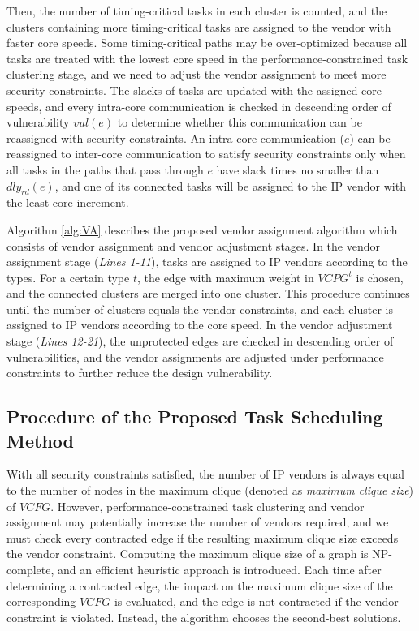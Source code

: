 \documentclass[10pt,journal, compsoc]{IEEEtran}
\begin{document}
Then, the number of timing-critical tasks in each cluster is counted, and the clusters containing more timing-critical tasks are assigned to the vendor with faster core speeds. Some timing-critical paths may be over-optimized because all tasks are treated with the lowest core speed in the performance-constrained task clustering stage, and we need to adjust the vendor assignment to meet more security constraints. The slacks of tasks are updated with the assigned core speeds, and every intra-core communication is checked in descending order of vulnerability $vul(e)$ to determine whether this communication can be reassigned with security constraints. An intra-core communication ($e$) can be reassigned to inter-core communication to satisfy security constraints only when all tasks in the paths that pass through $e$ have slack times no smaller than $dly_{rd}(e)$, and one of its connected tasks will be assigned to the IP vendor with the least core increment.%



Algorithm \ref{alg:VA} describes the proposed vendor assignment algorithm which consists of vendor assignment and vendor adjustment stages. In the vendor assignment stage (\textit{Lines 1-11}), tasks are assigned to IP vendors according to the types. For a certain type $t$, the edge with maximum weight in $VCPG^t$ is chosen, and the connected clusters are merged into one cluster. This procedure continues until the number of clusters equals the vendor constraints, and each cluster is assigned to IP vendors according to the core speed. In the vendor adjustment stage (\textit{Lines 12-21}), the unprotected edges are checked in descending order of vulnerabilities, and the vendor assignments are adjusted under performance constraints to further reduce the design vulnerability.




\subsection{Procedure of the Proposed Task Scheduling Method}

With all security constraints satisfied, the number of IP vendors is always equal to the number of nodes in the maximum clique (denoted as \textit{maximum clique size}) of $VCFG$. However, performance-constrained task clustering and vendor assignment may potentially increase the number of vendors required, and we must check every contracted edge if the resulting maximum clique size exceeds the vendor constraint. Computing the maximum clique size of a graph is NP-complete, and an efficient heuristic approach \cite{article:CL} is introduced. Each time after determining a contracted edge, the impact on the maximum clique size of the corresponding $VCFG$ is evaluated, and the edge is not contracted if the vendor constraint is violated. Instead, the algorithm chooses the second-best solutions.
\end{document}
